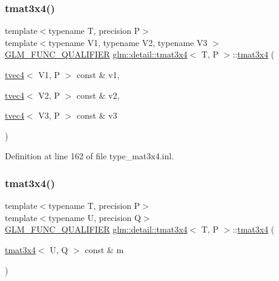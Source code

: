 \subsubsection{\texorpdfstring{tmat3x4()}{tmat3x4()}\hspace{0.1cm}{\footnotesize\ttfamily [21/22]}}
{\footnotesize\ttfamily template$<$typename T, precision P$>$ \\
template$<$typename V1, typename V2, typename V3 $>$ \\
\hyperlink{setup_8hpp_a33fdea6f91c5f834105f7415e2a64407}{G\+L\+M\+\_\+\+F\+U\+N\+C\+\_\+\+Q\+U\+A\+L\+I\+F\+I\+ER} \hyperlink{structglm_1_1detail_1_1tmat3x4}{glm\+::detail\+::tmat3x4}$<$ T, P $>$\+::\hyperlink{structglm_1_1detail_1_1tmat3x4}{tmat3x4} (\begin{DoxyParamCaption}\item[{\hyperlink{structglm_1_1detail_1_1tvec4}{tvec4}$<$ V1, P $>$ const \&}]{v1,  }\item[{\hyperlink{structglm_1_1detail_1_1tvec4}{tvec4}$<$ V2, P $>$ const \&}]{v2,  }\item[{\hyperlink{structglm_1_1detail_1_1tvec4}{tvec4}$<$ V3, P $>$ const \&}]{v3 }\end{DoxyParamCaption})}



Definition at line 162 of file type\+\_\+mat3x4.\+inl.

\mbox{\label{structglm_1_1detail_1_1tmat3x4_a3ccf735b71ee0db9bbeb1dd33022a761}} 
\subsubsection{\texorpdfstring{tmat3x4()}{tmat3x4()}\hspace{0.1cm}{\footnotesize\ttfamily [22/22]}}
{\footnotesize\ttfamily template$<$typename T, precision P$>$ \\
template$<$typename U, precision Q$>$ \\
\hyperlink{setup_8hpp_a33fdea6f91c5f834105f7415e2a64407}{G\+L\+M\+\_\+\+F\+U\+N\+C\+\_\+\+Q\+U\+A\+L\+I\+F\+I\+ER} \hyperlink{structglm_1_1detail_1_1tmat3x4}{glm\+::detail\+::tmat3x4}$<$ T, P $>$\+::\hyperlink{structglm_1_1detail_1_1tmat3x4}{tmat3x4} (\begin{DoxyParamCaption}\item[{\hyperlink{structglm_1_1detail_1_1tmat3x4}{tmat3x4}$<$ U, Q $>$ const \&}]{m }\end{DoxyParamCaption})}



